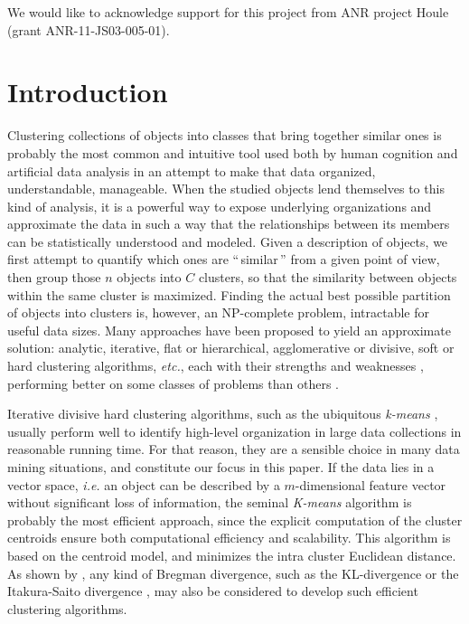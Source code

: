 \documentclass[natbib,smallextended]{svjour3}
\begin{document}

We would like to acknowledge support for this project
from ANR project Houle (grant ANR-11-JS03-005-01).

\section{Introduction}

Clustering collections of objects into classes that bring together similar ones is probably the most common and intuitive tool used both by human cognition and artificial data analysis in an attempt to make that data organized, understandable, manageable. When the studied objects lend themselves to this kind of analysis, it is a powerful way to expose underlying organizations and approximate the data in such a way that the relationships between its members can be statistically understood and modeled. Given a description of objects, we first attempt to quantify which ones are ``\,similar\,'' from a given point of view, then group those $n$ objects into $C$ clusters, so that the similarity between objects within the same cluster is maximized. Finding the actual best possible partition of objects into clusters is, however, an NP-complete problem, intractable for useful data sizes. Many approaches have been proposed to yield an approximate solution: analytic, iterative, flat or hierarchical, agglomerative or divisive, soft or hard clustering algorithms, \textit{etc.}, each with their strengths and weaknesses \citep{jain2010data}, performing better on some classes of problems than others \citep{steinbach2000comparison,thalamuthu2006evaluation}.

Iterative divisive hard clustering algorithms, such as the ubiquitous \emph{k-means} \citep{macQueenBsmsp67}, usually perform well to identify high-level organization in large data collections in reasonable running time. For that reason, they are a sensible choice in many data mining situations, and constitute our focus in this paper.
If the data lies in a vector space, \textit{i.e.} an object can be described by a $m$-dimensional feature vector without significant loss of information, the seminal \emph{K-means} algorithm \citep{macQueenBsmsp67} is probably the most efficient approach, since the explicit computation of the cluster centroids ensure both computational efficiency and scalability. This algorithm is  based on the centroid model, and minimizes the intra cluster Euclidean distance. As shown by \citet{Banerjee:2005:CBD:1046920.1194902}, any kind of Bregman divergence, such as the KL-divergence \citep{Dhillon:2003:DIT:944919.944973} or the Itakura-Saito divergence \citep{linde:algorithm}, may also be considered to develop such efficient clustering algorithms.
\end{document}
